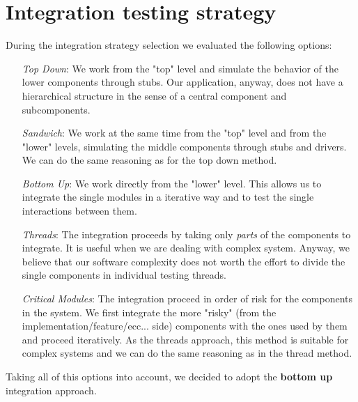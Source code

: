 \section{Integration testing strategy}
During the integration strategy selection we evaluated the following options:
\begin{itemize}
	\item[\textit{Top Down}:] We work from the "top" level and simulate the behavior of the lower components through stubs. Our application, anyway, does not have a hierarchical structure in the sense of a central component and subcomponents. 
	\item[\textit{Sandwich}:] We work at the same time from the "top" level and from the "lower" levels, simulating the middle components through stubs and drivers. We can do the same reasoning as for the top down method.
	\item[\textit{Bottom Up}:] We work directly from the "lower" level. This allows us to integrate the single modules in a iterative way and to test the single interactions between them.
	\item[\textit{Threads}:] The integration proceeds by taking only \textit{parts} of the components to integrate. It is useful when we are dealing with complex system. Anyway, we believe that our software complexity does not worth the effort to divide the single components in individual testing threads.
	\item[\textit{Critical Modules}:] The integration proceed in order of risk for the components in the system. We first integrate the more "risky" (from the implementation/feature/ecc... side) components with the ones used by them and proceed iteratively. As the threads approach, this method is suitable for complex systems and we can do the same reasoning as in the thread method.
\end{itemize}

Taking all of this options into account, we decided to adopt the \textbf{bottom up} integration approach.